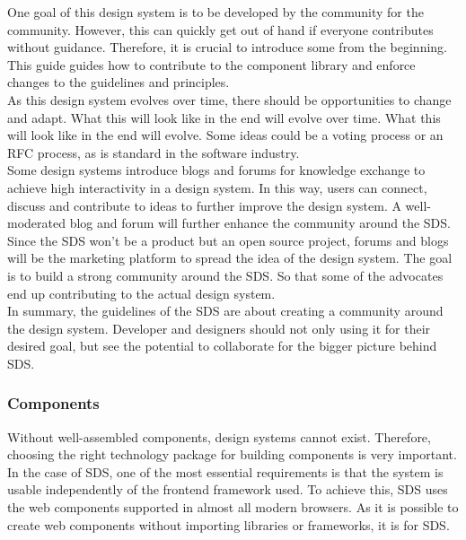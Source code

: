 One goal of this design system is to be developed by the community for the community. However, this can quickly get out of hand if everyone contributes without guidance. Therefore, it is crucial to introduce some from the beginning. This guide guides how to contribute to the component library and enforce changes to the guidelines and principles. \\
As this design system evolves over time, there should be opportunities to change and adapt. What this will look like in the end will evolve over time. What this will look like in the end will evolve. Some ideas could be a voting process or an RFC process, as is standard in the software industry. \\


Some design systems introduce blogs and forums for knowledge exchange to achieve high interactivity in a design system. In this way, users can connect, discuss and contribute to ideas to further improve the design system. A well-moderated blog and forum will further enhance the community around the \ac{SDS}. \\
Since the \ac{SDS} won't be a product but an open source project, forums and blogs will be the marketing platform to spread the idea of the design system. The goal is to build a strong community around the \ac{SDS}. So that some of the advocates end up contributing to the actual design system. \\

In summary, the guidelines of the \acl{SDS} are about creating a community around the design system. Developer and designers should not only using it for their desired goal, but see the potential to collaborate for the bigger picture behind \ac{SDS}.


\subsubsection{Components} \label{sds-component}
Without well-assembled components, design systems cannot exist. Therefore, choosing the right technology package for building components is very important. In the case of \ac{SDS}, one of the most essential requirements is that the system is usable independently of the frontend framework used. To achieve this, \ac{SDS} uses the web components supported in almost all modern browsers. As it is possible to create web components without importing libraries or frameworks, it is for \ac{SDS}. \citep{mdn_web_component_nodate} \\

